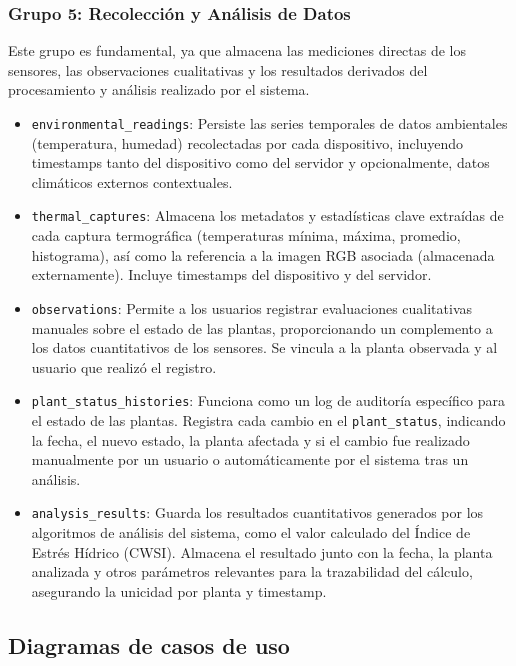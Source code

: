 \subsubsection*{Grupo 5: Recolección y Análisis de Datos}
Este grupo es fundamental, ya que almacena las mediciones directas de los sensores, las observaciones cualitativas y los resultados derivados del procesamiento y análisis realizado por el sistema.
\begin{itemize}
    \item \texttt{environmental\_readings}: Persiste las series temporales de datos ambientales (temperatura, humedad) recolectadas por cada dispositivo, incluyendo timestamps tanto del dispositivo como del servidor y opcionalmente, datos climáticos externos contextuales.
    \item \texttt{thermal\_captures}: Almacena los metadatos y estadísticas clave extraídas de cada captura termográfica (temperaturas mínima, máxima, promedio, histograma), así como la referencia a la imagen RGB asociada (almacenada externamente). Incluye timestamps del dispositivo y del servidor.
    \item \texttt{observations}: Permite a los usuarios registrar evaluaciones cualitativas manuales sobre el estado de las plantas, proporcionando un complemento a los datos cuantitativos de los sensores. Se vincula a la planta observada y al usuario que realizó el registro.
    \item \texttt{plant\_status\_histories}: Funciona como un log de auditoría específico para el estado de las plantas. Registra cada cambio en el \texttt{plant\_status}, indicando la fecha, el nuevo estado, la planta afectada y si el cambio fue realizado manualmente por un usuario o automáticamente por el sistema tras un análisis.
    \item \texttt{analysis\_results}: Guarda los resultados cuantitativos generados por los algoritmos de análisis del sistema, como el valor calculado del Índice de Estrés Hídrico (CWSI). Almacena el resultado junto con la fecha, la planta analizada y otros parámetros relevantes para la trazabilidad del cálculo, asegurando la unicidad por planta y timestamp.
\end{itemize}


\subsection{Diagramas de casos de uso}
\label{sec:casos_uso}

